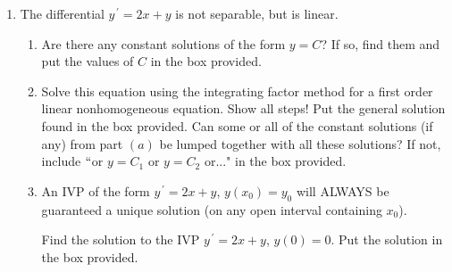 \documentclass{ximera}
\begin{document}
\begin{enumerate}
\begin{enumerate}
    \vspace{2cm}

\end{enumerate}

\newpage

\item The differential $y^{\,\prime}=2x+y$ is not separable, but is linear.





\begin{enumerate}

\item  Are there any constant solutions of the form $y=C$?  If so, find them and put the values of $C$ in the box provided.

\vfill

\hfill{}




\item  Solve this equation using the integrating factor method for a first order linear nonhomogeneous equation.  Show all steps!  Put the general solution found in the box provided.  Can some or all of the constant solutions (if any) from part $(a)$ be lumped together with all these solutions?  If not, include $``$or $y=C_{1}$ or $y=C_{2}$  or..." in the box provided.

\vfill

\hfill{}



\item  An IVP of the form $y^{\,\prime}=2x+y$, $y(x_{0})=y_{0}$ will ALWAYS be guaranteed a unique solution (on any open interval containing $x_{0}$).

Find the solution to the IVP $y^{\,\prime}=2x+y$, $y(0)=0$.  Put the solution in the box provided.


\end{enumerate}
\end{enumerate}
\end{document}
